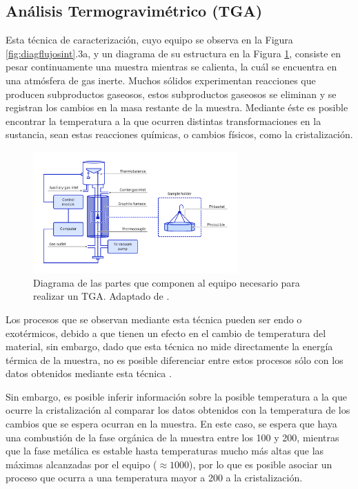 \documentclass[../main.tex]{subfiles}
\begin{document}
\subsection{Análisis Termogravimétrico (TGA)}
Esta técnica de caracterización, cuyo equipo se observa en la Figura \ref{fig:diagflujosint}.3a, y un diagrama de su estructura en la Figura \ref{fig:diagTGA}, consiste en pesar continuamente una muestra mientras se calienta, la cuál se encuentra en una atmósfera de gas inerte. Muchos sólidos experimentan reacciones que producen subproductos gaseosos, estos subproductos gaseosos se eliminan y se registran los cambios en la masa restante de la muestra. Mediante éste es posible encontrar la temperatura a la que ocurren distintas transformaciones en la sustancia, sean estas reacciones químicas, o cambios físicos, como la cristalización.
\begin{figure}[H]
    \centering
    \includegraphics[width=0.7\textwidth]{fig/tgadiag.png}
    \caption{Diagrama de las partes que componen al equipo necesario para realizar un TGA. Adaptado de \cite{TGADIAG}.}
    \label{fig:diagTGA}
\end{figure}
Los procesos que se observan mediante esta técnica pueden ser endo o exotérmicos, debido a que tienen un efecto en el cambio de temperatura del material, sin embargo, dado que esta técnica no mide directamente la energía térmica de la muestra, no es posible diferenciar entre estos procesos sólo con los datos obtenidos mediante esta técnica \cite{TGA}.

Sin embargo, es posible inferir información sobre la posible temperatura a la que ocurre la cristalización al comparar los datos obtenidos con la temperatura de los cambios que se espera ocurran en la muestra. En este caso, se espera que haya una combustión de la fase orgánica de la muestra entre los 100 y 200\gradoC{}, mientras que la fase metálica es estable hasta temperaturas mucho más altas que las máximas alcanzadas por el equipo ($\approx1000$\gradoC{}), por lo que es posible asociar un proceso que ocurra a una temperatura mayor a 200\gradoC{} a la cristalización.
\end{document}
